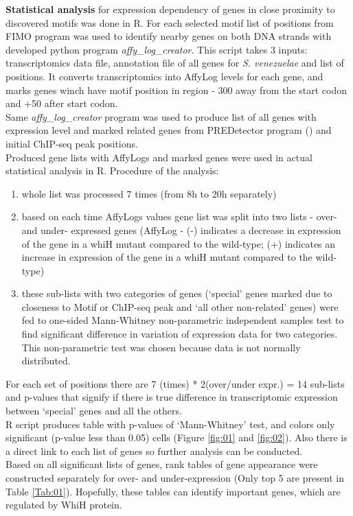 \documentclass{bioinfo}
\begin{document}
\begin{methods}
{\bf Statistical analysis} for expression dependency of genes in close proximity to discovered motifs was done in R. For each selected motif list of positions from FIMO program was used to identify nearby genes on both DNA strands with developed python program {\it affy\_log\_creator}. This script takes 3 inputs: transcriptomics data file, annotation file of all genes for {\it S. venezuelae} and list of positions. It converts transcriptomics into AffyLog levels for each gene, and marks genes winch have motif position in region - 300 away from the start codon and +50 after start codon.\\
Same {\it affy\_log\_creator} program was used to produce list of all genes with expression level and marked related genes from PREDetector program (\citealp{Predetector}) and initial ChIP-seq peak positions.\\
Produced gene lists with AffyLogs and marked genes were used in actual statistical analysis in R. Procedure of the analysis:

\begin{enumerate}
\item whole list was processed 7 times (from 8h to 20h separately)
\item based on each time AffyLogs values gene list was split into two lists - over- and under- expressed genes (AffyLog - (-) indicates a decrease in expression of the gene in a whiH mutant compared to the wild-type; (+) indicates an increase in expression of the gene in a whiH mutant compared to the wild-type)
\item these sub-lists with two categories of genes (‘special’ genes marked due to closeness to Motif or ChIP-seq peak and ‘all other non-related’ genes) were fed to one-sided Mann‐Whitney non-parametric independent samples test to find significant difference in variation of expression data for two categories. This non-parametric test was chosen because data is not normally distributed.\\
\end{enumerate}
For each set of positions there are 7 (times) * 2(over/under expr.) = 14 sub-lists and p-values that signify if there is true difference in transcriptomic expression between ‘special’ genes and all the others.\\
R script produces table with p-values of ‘Mann-Whitney’ test, and colors only significant (p-value less than 0.05) cells (Figure \ref{fig:01} and \ref{fig:02}).  Also there is a direct link to each list of genes so further analysis can be conducted.\\
Based on all significant lists of genes, rank tables of gene appearance were constructed separately for over- and under-expression (Only top 5 are present in Table \ref{Tab:01}). Hopefully, these tables can identify important genes, which are regulated by WhiH protein.\\


\end{methods}
\end{document}
